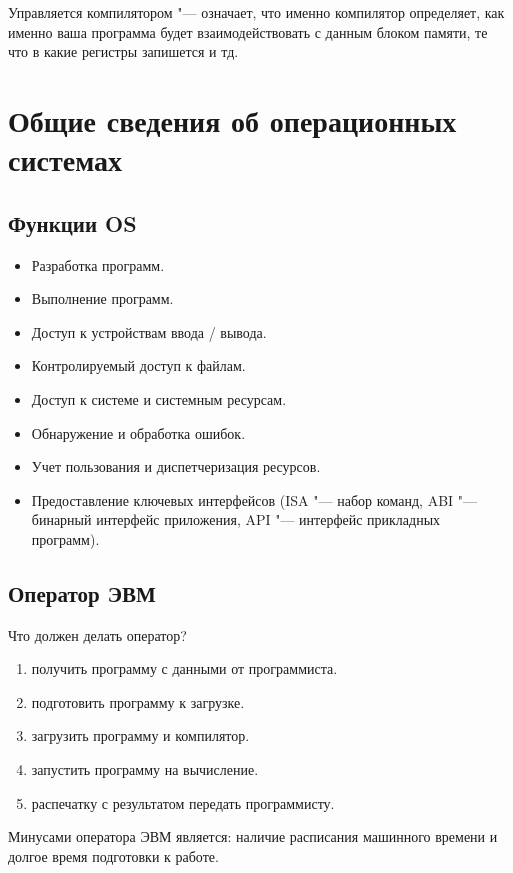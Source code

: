 \documentclass[bachelor, och, book]{SCWorks}
\theoremstyle{remark}
\begin{document}
    Управляется компилятором "--- означает, что именно компилятор определяет, как именно ваша программа будет взаимодействовать с данным блоком памяти, те что в какие регистры запишется и тд. 


    \section{Общие сведения об операционных системах}
    
    \subsection{Функции OS}
    
    \begin{itemize}[label=$\bullet$]
        \item Разработка программ.
        \item Выполнение программ.
        \item Доступ к устройствам ввода / вывода.
        \item Контролируемый доступ к файлам.
        \item Доступ к системе и системным ресурсам.
        \item Обнаружение и обработка ошибок.
        \item Учет пользования и диспетчеризация ресурсов.
        \item Предоставление ключевых интерфейсов (ISA "--- набор команд, ABI "--- бинарный интерфейс приложения, API "--- интерфейс прикладных программ).
    \end{itemize}
    
    \subsection{Оператор ЭВМ}
    Что должен делать оператор?
    \begin{enumerate}
        \item получить программу с данными от программиста.
        \item подготовить программу к загрузке.
        \item загрузить программу и компилятор.
        \item запустить программу на вычисление.
        \item распечатку с результатом передать программисту.
    \end{enumerate}

    Минусами оператора ЭВМ является: наличие расписания машинного времени и долгое время подготовки к работе.
\end{document}
